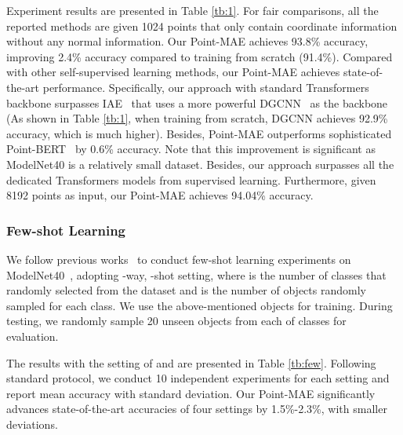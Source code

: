 \documentclass[runningheads]{llncs}
\begin{document}
Experiment results are presented in Table \ref{tb:1}. For fair comparisons, all the reported methods are given 1024 points that only contain coordinate information without any normal information. Our Point-MAE achieves 93.8\% accuracy, improving 2.4\% accuracy compared to training from scratch (91.4\%). Compared with other self-supervised learning methods, our Point-MAE achieves state-of-the-art performance. Specifically, our approach with standard Transformers backbone surpasses IAE~\cite{ptiae} that uses a more powerful DGCNN~\cite{ptdgcnn} as the backbone (As shown in Table \ref{tb:1}, when training from scratch, DGCNN achieves 92.9\% accuracy, which is much higher). Besides, Point-MAE outperforms sophisticated Point-BERT~\cite{pointbert} by 0.6\% accuracy. Note that this improvement is significant as ModelNet40 is a relatively small dataset. Besides, our approach surpasses all the dedicated Transformers models from supervised learning. Furthermore, given 8192 points as input, our Point-MAE achieves 94.04\% accuracy. 

\subsubsection{Few-shot Learning}

We follow previous works~\cite{pointbert,fewshot,ptocco} to conduct few-shot learning experiments on ModelNet40~\cite{modelnet}, adopting -way, -shot setting, where  is the number of classes that randomly selected from the dataset and  is the number of objects randomly sampled for each class. We use the above-mentioned  objects for training. During testing, we randomly sample 20 unseen objects from each of  classes for evaluation. 

The results with the setting of  and  are presented in Table \ref{tb:few}. Following standard protocol, we conduct 10 independent experiments for each setting and report mean accuracy with standard deviation. Our Point-MAE significantly advances state-of-the-art accuracies of four settings by 1.5\%-2.3\%, with smaller deviations. 
\end{document}
